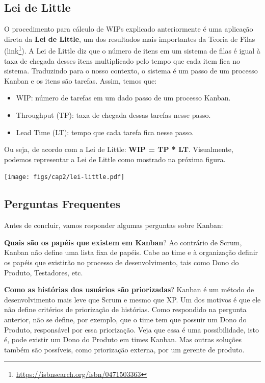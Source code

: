 \documentclass[
  11pt,
  twoside]{book}
\DeclareRobustCommand{\href}[2]{#2\footnote{\url{#1}}}
\let\origfigure\figure
\let\endorigfigure\endfigure
\renewenvironment{figure}[1][2] {
    \expandafter\origfigure\expandafter[!h]
} {
    \endorigfigure
}
\begin{document}
\hypertarget{lei-de-little}{%
\subsection{Lei de Little}\label{lei-de-little}}

 

O procedimento para cálculo de WIPs explicado anteriormente é uma
aplicação direta da \textbf{Lei de Little}, um dos resultados mais
importantes da Teoria de Filas
(\href{https://isbnsearch.org/isbn/0471503363}{link}). A Lei de Little
diz que o número de itens em um sistema de filas é igual à taxa de
chegada desses itens multiplicado pelo tempo que cada item fica no
sistema. Traduzindo para o nosso contexto, o sistema é um passo de um
processo Kanban e os itens são tarefas. Assim, temos que:

\begin{itemize}
\item
  WIP: número de tarefas em um dado passo de um processo Kanban.
\item
  Throughput (TP):  taxa de chegada dessas tarefas
  nesse passo.
\item
  Lead Time (LT):  tempo que cada tarefa fica nesse
  passo.
\end{itemize}

Ou seja, de acordo com a Lei de Little: \textbf{WIP = TP * LT}.
Visualmente, podemos representar a Lei de Little como mostrado na
próxima figura.

\begin{figure}
\centering
\texttt{[image: figs/cap2/lei-little.pdf]}
\caption{Lei de Little: WIP = TP * LT}
\end{figure}

\hypertarget{perguntas-frequentes-2}{%
\subsection{Perguntas Frequentes}\label{perguntas-frequentes-2}}

Antes de concluir, vamos responder algumas perguntas sobre Kanban:

\textbf{Quais são os papéis que existem em Kanban}? Ao contrário de
Scrum, Kanban não define uma lista fixa de papéis. Cabe ao time e à
organização definir os papéis que existirão no processo de
desenvolvimento, tais como Dono do Produto, Testadores, etc.

\textbf{Como as histórias dos usuários são priorizadas}? Kanban é um
método de desenvolvimento mais leve que Scrum e mesmo que XP. Um dos
motivos é que ele não define critérios de priorização de histórias. Como
respondido na pergunta anterior, não se define, por exemplo, que o time
tem que possuir um Dono do Produto, responsável por essa priorização.
Veja que essa é uma possibilidade, isto é, pode existir um Dono do
Produto em times Kanban. Mas outras soluções também são possíveis, como
priorização externa, por um gerente de produto.
\end{document}
